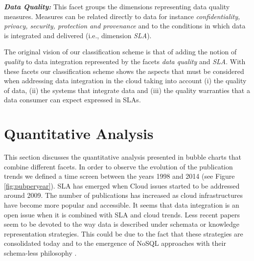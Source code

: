 \textbf{\textit{Data Quality:}} 
This facet groups the dimensions  representing data quality measures. Measures can be related directly to data for instance {\em confidentiality, privacy, security, protection and provenance} and to the conditions in which data is integrated and delivered  (i.e., dimension {\em SLA}).           

The original vision of our classification scheme is that of adding the notion of {\em quality} to data integration represented by the facets {\em data quality}
and  {\em SLA}.
With these facets our classification scheme shows the aspects that must be considered when addressing data integration in the cloud  taking into account (i) the quality of data, (ii) the systems that integrate data and (iii) the quality warranties that a data consumer can expect expressed in SLAs.

\section{Quantitative Analysis}\label{sec:qanalysis}

This section discusses the quantitative analysis  presented in bubble charts that combine different facets. 
In order to observe the evolution of the publication trends we defined a time screen between the years 1998 and 2014 (see Figure \ref{fig:pubperyear}). SLA has emerged when Cloud issues started to be addressed around 2009. The number of publications has increased as cloud infrastructures have become more popular and accessible. It seems  that data integration is an open issue when it is combined with SLA and cloud trends. Less recent papers seem to be devoted to the way data is described under schemata or knowledge representation strategies. This could be due to the fact that these strategies are consolidated today and  to the emergence of NoSQL approaches with their schema-less philosophy \cite{sadalage2012nosql}. 

